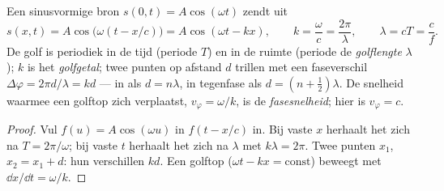 \begin{proposition}\label{prop:b1:wave-propagation:sinusoidal}
Een sinusvormige bron $s(0, t) = A\cos(\omega t)$ zendt uit
\[
s(x, t) = A\cos\!\big(\omega(t - x/c)\big) = A\cos(\omega t - kx),
\qquad k = \frac{\omega}{c} = \frac{2\pi}{\lambda},
\qquad \lambda = cT = \frac{c}{f}.
\]
De golf is periodiek in de tijd (periode $T$) en in de ruimte (periode de
\emph{golflengte} $\lambda$); $k$ is het \emph{golfgetal}; twee punten
op afstand $d$ trillen met een faseverschil
$\Delta\varphi = 2\pi d/\lambda = kd$ --- in  als $d = n\lambda$, in
tegenfase als $d = (n + \tfrac12)\lambda$. De snelheid waarmee een
golftop zich verplaatst, $v_\varphi = \omega/k$, is de \emph{fasesnelheid};
hier is $v_\varphi = c$.
\end{proposition}

\begin{proof}
Vul $f(u) = A\cos(\omega u)$ in $f(t - x/c)$ in. Bij vaste $x$ herhaalt het
 zich na $T = 2\pi/\omega$; bij vaste $t$ herhaalt het zich na
$\lambda$ met $k\lambda = 2\pi$. Twee punten $x_1$, $x_2 = x_1 + d$: hun
 verschillen $kd$. Een golftop ($\omega t - kx = \text{const}$) beweegt met
$\dd x/\dd t = \omega/k$.
\end{proof}

